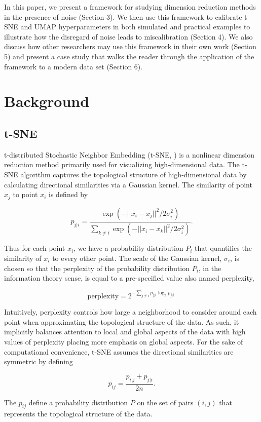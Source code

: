 \documentclass{article}
\begin{document}
In this paper, we present a framework for studying dimension reduction methods in the presence of noise (Section 3). We then use this framework to calibrate t-SNE and UMAP hyperparameters in both simulated and practical examples to illustrate how the disregard of noise leads to miscalibration (Section 4). We also discuss how other researchers may use this framework in their own work (Section 5) and present a case study that walks the reader through the application of the framework to a modern data set (Section 6).

\section{Background}

\subsection{t-SNE}
t-distributed Stochastic Neighbor Embedding (t-SNE, \cite{t-SNE}) is a nonlinear dimension reduction method primarily used for visualizing high-dimensional data. The t-SNE algorithm captures the topological structure of high-dimensional data by calculating directional similarities via a Gaussian kernel. The similarity of point $x_j$ to point $x_i$ is defined by \begin{linenomath}$$p_{j|i} = \frac{\exp(-||x_i - x_j||^2/2\sigma_i^2)}{\sum_{k \neq i} \exp(-||x_i-x_k||^2/2\sigma_i^2)}.$$\end{linenomath} Thus for each point $x_i$, we have a probability distribution $P_i$ that quantifies the similarity of $x_i$ to every other point. The scale of the Gaussian kernel, $\sigma_i$, is chosen so that the perplexity of the probability distribution $P_i$, in the information theory sense, is equal to a pre-specified value also named perplexity, \begin{linenomath}$$\textrm{perplexity} = 2^{-\sum_{j \neq i} p_{j|i}\log_2 p_{j|i}.}$$\end{linenomath} Intuitively, perplexity controls how large a neighborhood to consider around each point when approximating the topological structure of the data. As such, it implicitly balances attention to local and global aspects of the data with high values of perplexity placing more emphasis on global aspects. For the sake of computational convenience, t-SNE assumes the directional similarities are symmetric by defining \begin{linenomath}$$p_{ij} = \frac{p_{i|j} + p_{j|i}}{2n}.$$\end{linenomath} The $p_{ij}$ define a probability distribution $P$ on the set of pairs $(i,j)$ that represents the topological structure of the data.
\end{document}
